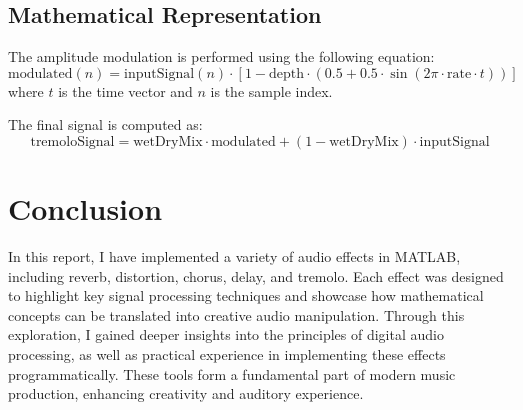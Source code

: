 \documentclass{article}
\begin{document}
\subsection{Mathematical Representation}
The amplitude modulation is performed using the following equation:
\[
\text{modulated}(n) = \text{inputSignal}(n) \cdot \left[1 - \text{depth} \cdot \left(0.5 + 0.5 \cdot \sin(2 \pi \cdot \text{rate} \cdot t)\right)\right]
\]
where \(t\) is the time vector and \(n\) is the sample index.

The final signal is computed as:
\[
\text{tremoloSignal} = \text{wetDryMix} \cdot \text{modulated} + (1 - \text{wetDryMix}) \cdot \text{inputSignal}
\]

\section{Conclusion}

In this report, I have implemented a variety of audio effects in MATLAB, including reverb, distortion, chorus, delay, and tremolo. Each effect was designed to highlight key signal processing techniques and showcase how mathematical concepts can be translated into creative audio manipulation. Through this exploration, I gained deeper insights into the principles of digital audio processing, as well as practical experience in implementing these effects programmatically. These tools form a fundamental part of modern music production, enhancing creativity and auditory experience.
\end{document}
